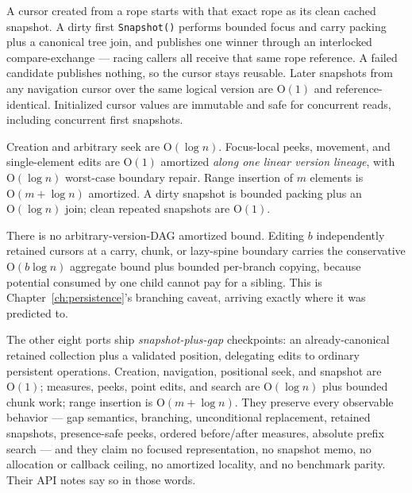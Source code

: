 \documentclass[11pt,twoside,openright]{book}
\newcommand{\code}[1]{\texorpdfstring{\textcolor{d7ink}{\texttt{#1}}}{#1}}
\newcommand{\term}[1]{\textit{#1}}
\newcommand{\bigoh}[1]{$\mathrm{O}(#1)$}
\begin{document}
\begin{contractbox}
A cursor created from a rope starts with that exact rope as its clean cached
snapshot. A dirty first \code{Snapshot()} performs bounded focus and carry
packing plus a canonical tree join, and publishes one winner through an
interlocked compare-exchange --- racing callers all receive that same rope
reference. A failed candidate publishes nothing, so the cursor stays reusable.
Later snapshots from any navigation cursor over the same logical version are
\bigoh{1} and reference-identical. Initialized cursor values are immutable and
safe for concurrent reads, including concurrent first snapshots.
\end{contractbox}

\begin{caveatbox}
Creation and arbitrary seek are \bigoh{\log n}. Focus-local peeks, movement, and
single-element edits are \bigoh{1} amortized \emph{along one linear version
lineage}, with \bigoh{\log n} worst-case boundary repair. Range insertion of $m$
elements is \bigoh{m + \log n} amortized. A dirty snapshot is bounded packing
plus an \bigoh{\log n} join; clean repeated snapshots are \bigoh{1}.

There is no arbitrary-version-DAG amortized bound. Editing $b$ independently
retained cursors at a carry, chunk, or lazy-spine boundary carries the
conservative \bigoh{b \log n} aggregate bound plus bounded per-branch copying,
because potential consumed by one child cannot pay for a sibling. This is
Chapter~\ref{ch:persistence}'s branching caveat, arriving exactly where it was
predicted to.
\end{caveatbox}

The other eight ports ship \term{snapshot-plus-gap} checkpoints: an
already-canonical retained collection plus a validated position, delegating edits
to ordinary persistent operations. Creation, navigation, positional seek, and
snapshot are \bigoh{1}; measures, peeks, point edits, and search are
\bigoh{\log n} plus bounded chunk work; range insertion is \bigoh{m + \log n}.
They preserve every observable behavior --- gap semantics, branching,
unconditional replacement, retained snapshots, presence-safe peeks, ordered
before/after measures, absolute prefix search --- and they claim no focused
representation, no snapshot memo, no allocation or callback ceiling, no
amortized locality, and no benchmark parity. Their API notes say so in those
words.
\end{document}
